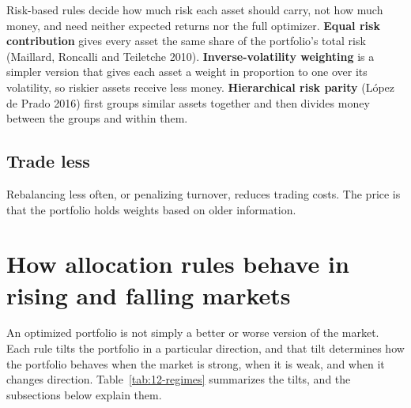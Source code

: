 Risk-based rules decide how much risk each asset should carry, not how much money, and need neither expected returns nor the full optimizer. \textbf{Equal risk contribution} gives every asset the same share of the portfolio's total risk (Maillard, Roncalli and Teiletche 2010). \textbf{Inverse-volatility weighting} is a simpler version that gives each asset a weight in proportion to one over its volatility, so riskier assets receive less money. \textbf{Hierarchical risk parity} (L\'opez de Prado 2016) first groups similar assets together and then divides money between the groups and within them.

\subsection{Trade less}

Rebalancing less often, or penalizing turnover, reduces trading costs. The price is that the portfolio holds weights based on older information.


\section{How allocation rules behave in rising and falling markets}
\label{sec:12-regimes}

An optimized portfolio is not simply a better or worse version of the market. Each rule tilts the portfolio in a particular direction, and that tilt determines how the portfolio behaves when the market is strong, when it is weak, and when it changes direction. Table~\ref{tab:12-regimes} summarizes the tilts, and the subsections below explain them.

